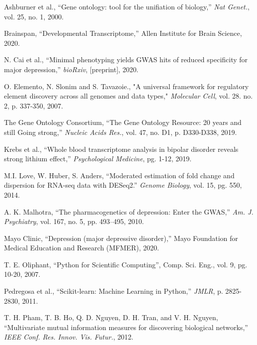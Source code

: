 \documentclass{bioinfo}
\begin{document}
\begin{thebibliography}{}


Ashburner et al., “Gene ontology: tool for the unifiation of biology,” {\it Nat Genet.}, vol. 25,  no. 1, 2000.

Brainspan, “Developmental Transcriptome,” Allen Institute for Brain Science, 2020.

N. Cai et al., “Minimal phenotyping yields GWAS hits of reduced specificity for major depression,” {\it bioRxiv}, [preprint], 2020.

O. Elemento, N. Slonim and S. Tavazoie., "A universal framework for regulatory element discovery across all genomes and data types," {\it Molecular Cell}, vol. 28. no. 2, p. 337-350, 2007.

The Gene Ontology Consortium, “The Gene Ontology Resource: 20 years and still Going strong,” {\it Nucleic Acids Res.}, vol. 47, no. D1, p. D330-D338, 2019.

Krebs et al., “Whole blood transcriptome analysis in bipolar disorder reveals strong lithium effect,” {\it Psychological Medicine}, pg. 1-12, 2019.

M.I. Love, W. Huber, S. Anders, “Moderated estimation of fold change and dispersion for RNA-seq data with DESeq2.” {\it Genome Biology}, vol. 15, pg. 550, 2014.

A. K. Malhotra, “The pharmacogenetics of depression: Enter the GWAS,” {\it Am. J. Psychiatry}, vol. 167, no. 5, pp. 493–495, 2010.

Mayo Clinic, “Depression (major depressive disorder),” Mayo Foundation for Medical Education and Research (MFMER), 2020.

T. E. Oliphant, “Python for Scientific Computing”, Comp. Sci. Eng., vol. 9,  pg. 10-20, 2007.

Pedregosa et al., “Scikit-learn: Machine Learning in Python,” {\it JMLR}, p. 2825-2830, 2011.

T. H. Pham, T. B. Ho, Q. D. Nguyen, D. H. Tran, and V. H. Nguyen, “Multivariate mutual information measures for discovering biological networks,” {\it IEEE Conf. Res. Innov. Vis. Futur.}, 2012.


\end{thebibliography}
\end{document}
